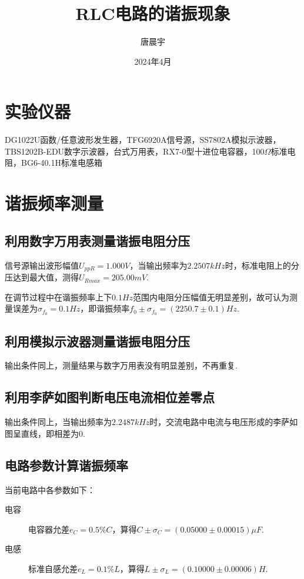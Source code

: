 \documentclass[12pt, a4paper]{ctexart}
\begin{document}
\title{RLC电路的谐振现象}
\author{唐晨宇 }
\date{2024年4月}

\maketitle
\tableofcontents
\clearpage


\section*{实验仪器}
DG1022U函数/任意波形发生器，TFG6920A信号源，SS7802A模拟示波器，TBS\;1202B-EDU数字示波器，台式万用表，RX7-0型十进位电容器，100$\Omega$标准电阻，BG6-4\;0.1H标准电感箱

\section{谐振频率测量}
\subsection{利用数字万用表测量谐振电阻分压}
信号源输出波形幅值$U_{ppR} = 1.000 V$，当输出频率为$2.2507 kHz$时，标准电阻上的分压达到最大值，测得$U_{Rmax} = 205.00mV$.

在调节过程中在谐振频率上下$0.1Hz$范围内电阻分压幅值无明显差别，故可认为测量误差为$\sigma_{f_0} = 0.1Hz$，即谐振频率$f_0 \pm \sigma_{f_0} = (2250.7 \pm 0.1)Hz$.

\subsection{利用模拟示波器测量谐振电阻分压}
输出条件同上，测量结果与数字万用表没有明显差别，不再重复.

\subsection{利用李萨如图判断电压电流相位差零点}
输出条件同上，当输出频率为$2.2487 kHz$时，交流电路中电流与电压形成的李萨如图呈直线，即相差为0.

\subsection{电路参数计算谐振频率}
当前电路中各参数如下：
\begin{description}
    \item[电容] 电容器允差$e_C = 0.5\%C$，算得$C \pm \sigma_{C} = (0.05000 \pm 0.00015) \mu F$.
    \item[电感] 标准自感允差$e_L= 0.1\%L$，算得$L \pm \sigma_{L} = (0.10000 \pm 0.00006) H$.
\end{description}
\end{document}

